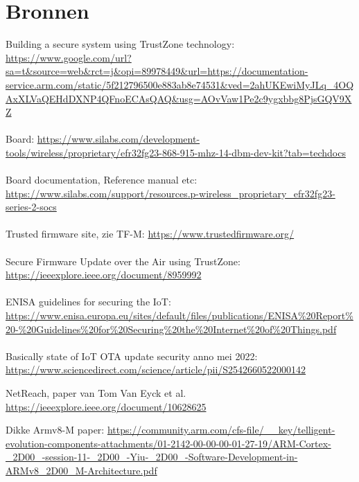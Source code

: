 \section{Bronnen}
Building a secure system using TrustZone technology: \url{https://www.google.com/url?sa=t&source=web&rct=j&opi=89978449&url=https://documentation-service.arm.com/static/5f212796500e883ab8e74531&ved=2ahUKEwiMyJLq_4OQAxXLVaQEHdDXNP4QFnoECAsQAQ&usg=AOvVaw1Pe2c9ygxbbg8PjsGQV9XZ}
\\
\\
Board: \url{https://www.silabs.com/development-tools/wireless/proprietary/efr32fg23-868-915-mhz-14-dbm-dev-kit?tab=techdocs}
\\
\\
Board documentation, Reference manual etc: \url{https://www.silabs.com/support/resources.p-wireless_proprietary_efr32fg23-series-2-socs}
\\
\\
Trusted firmware site, zie TF-M: \url{https://www.trustedfirmware.org/}
\\
\\
Secure Firmware Update over the Air using TrustZone: \url{https://ieeexplore.ieee.org/document/8959992}
\\
\\
ENISA guidelines for securing the IoT: \url{https://www.enisa.europa.eu/sites/default/files/publications/ENISA\%20Report\%20-\%20Guidelines\%20for\%20Securing\%20the\%20Internet\%20of\%20Things.pdf}
\\
\\
Basically state of IoT OTA update security anno mei 2022: \url{https://www.sciencedirect.com/science/article/pii/S2542660522000142}

NetReach, paper van Tom Van Eyck et al. \url{https://ieeexplore.ieee.org/document/10628625}

Dikke Armv8-M paper: \url{https://community.arm.com/cfs-file/__key/telligent-evolution-components-attachments/01-2142-00-00-00-01-27-19/ARM-Cortex-_2D00_-session-11-_2D00_-Yiu-_2D00_-Software-Development-in-ARMv8_2D00_M-Architecture.pdf}
